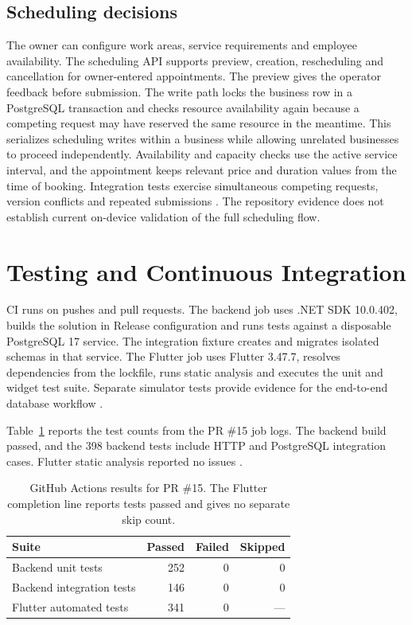 \documentclass[12pt]{report}
\begin{document}
\subsection{Scheduling decisions}
The owner can configure work areas, service requirements and employee availability. The scheduling API supports preview, creation, rescheduling and cancellation for owner-entered appointments. The preview gives the operator feedback before submission. The write path locks the business row in a PostgreSQL transaction and checks resource availability again because a competing request may have reserved the same resource in the meantime. This serializes scheduling writes within a business while allowing unrelated businesses to proceed independently. Availability and capacity checks use the active service interval, and the appointment keeps relevant price and duration values from the time of booking. Integration tests exercise simultaneous competing requests, version conflicts and repeated submissions \cite{phase9}. The repository evidence does not establish current on-device validation of the full scheduling flow.

\section{Testing and Continuous Integration}
CI runs on pushes and pull requests. The backend job uses .NET SDK 10.0.402, builds the solution in Release configuration and runs tests against a disposable PostgreSQL 17 service. The integration fixture creates and migrates isolated schemas in that service. The Flutter job uses Flutter 3.47.7, resolves dependencies from the lockfile, runs static analysis and executes the unit and widget test suite. Separate simulator tests provide evidence for the end-to-end database workflow \cite{fluttertesting,phase7}.

Table~\ref{tab:ci} reports the test counts from the PR \#15 job logs. The backend build passed, and the 398 backend tests include HTTP and PostgreSQL integration cases. Flutter static analysis reported no issues \cite{ciBackendLog,ciFlutterLog}.

\begin{table}[htbp]
\centering
\small
\begin{tabular}{@{}lrrr@{}}
\toprule
Suite & Passed & Failed & Skipped \\
\midrule
Backend unit tests & 252 & 0 & 0 \\
Backend integration tests & 146 & 0 & 0 \\
Flutter automated tests & 341 & 0 & --- \\
\bottomrule
\end{tabular}
\caption{GitHub Actions results for PR \#15. The Flutter completion line reports tests passed and gives no separate skip count.}
\label{tab:ci}
\end{table}
\end{document}
